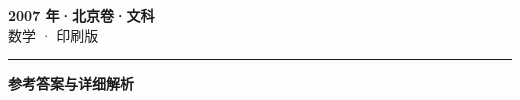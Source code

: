 \documentclass[zihao=5, a4paper]{ctexart}
\begin{document}
\begin{center}
  {\Large\bfseries 2007 年·北京卷·文科}\\[4pt]
  {\large 数学 · 印刷版}
\end{center}
\medskip
{}

\par\bigskip\hrule\bigskip
{}
\begin{center}{\large\bfseries 参考答案与详细解析}\end{center}
\smallskip

\end{document}
